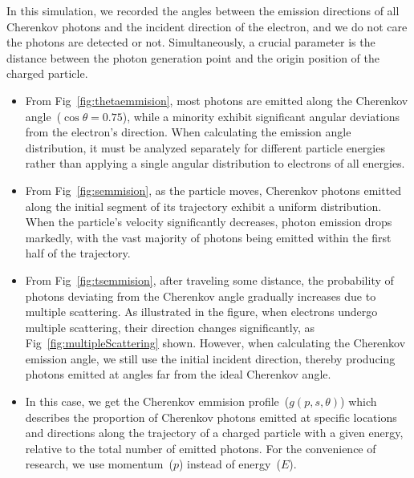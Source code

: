 In this simulation, we recorded the angles between the emission directions of all Cherenkov photons and the incident direction of the electron, and we do not care the photons are detected or not. Simultaneously, a crucial parameter is the distance between the photon generation point and the origin position of the charged particle.
\begin{itemize}
	\item From Fig~\ref{fig:thetaemmision}, most photons are emitted along the Cherenkov angle~($\cos\theta=0.75$), while a minority exhibit significant angular deviations from the electron's direction. When calculating the emission angle distribution, it must be analyzed separately for different particle energies rather than applying a single angular distribution to electrons of all energies.
	\item From Fig~\ref{fig:semmision}, as the particle moves, Cherenkov photons emitted along the initial segment of its trajectory exhibit a uniform distribution. When the particle's velocity significantly decreases, photon emission drops markedly, with the vast majority of photons being emitted within the first half of the trajectory.
	\item From Fig~\ref{fig:tsemmision}, after traveling some distance, the probability of photons deviating from the Cherenkov angle gradually increases due to multiple scattering. As illustrated in the figure, when electrons undergo multiple scattering, their direction changes significantly, as Fig~\ref{fig:multipleScattering} shown. However, when calculating the Cherenkov emission angle, we still use the initial incident direction, thereby producing photons emitted at angles far from the ideal Cherenkov angle.
	\item In this case, we get the Cherenkov emmision profile~($g(p,s,\theta)$) which describes the proportion of Cherenkov photons emitted at specific locations and directions along the trajectory of a charged particle with a given energy, relative to the total number of emitted photons. For the convenience of research, we use momentum~($p$) instead of energy~($E$).
\end{itemize}

